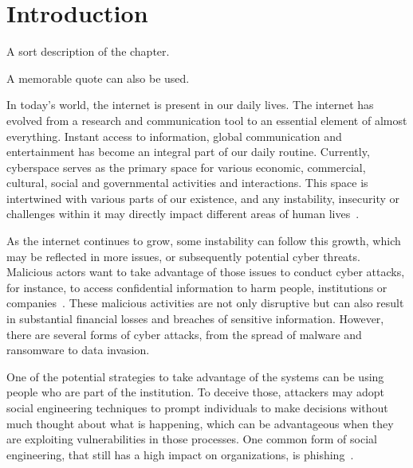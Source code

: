 \chapter{Introduction}
\label{chapter:introduction}

\begin{introduction}
A sort description of the chapter.

A memorable quote can also be used.
\end{introduction}





In today's world, the internet is present in our daily lives. The internet has evolved from a research and communication tool to an essential element of almost everything. Instant access to information, global communication and entertainment has become an integral part of our daily routine. Currently, cyberspace serves as the primary space for various economic, commercial, cultural, social and governmental activities and interactions. This space is intertwined with various parts of our existence, and any instability, insecurity or challenges within it may directly impact different areas of human lives~\cite{li2021comprehensive}. 


As the internet continues to grow, some instability can follow this growth, which may be reflected in more issues, or subsequently potential cyber threats. Malicious actors want to take advantage of those issues to conduct cyber attacks, for instance, to access confidential information to harm people, institutions or companies~\cite{}. These malicious activities are not only disruptive but can also result in substantial financial losses and breaches of sensitive information. However, there are several forms of cyber attacks, from the spread of malware and ransomware to data invasion.

One of the potential strategies to take advantage of the systems can be using people who are part of the institution. To deceive those, attackers may adopt social engineering techniques to prompt individuals to make decisions without much thought about what is happening, which can be advantageous when they are exploiting vulnerabilities in those processes. One common form of social engineering, that still has a high impact on organizations, is phishing~\cite{cisa2023cyberattacks}.

